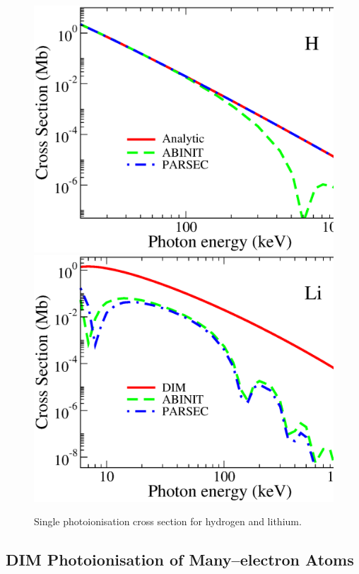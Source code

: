 \documentclass[10pt]{article}
\begin{document}
\begin{figure}[H]
\centering
 \includegraphics[height=0.23\textheight]{figures/pseudopot/photoionH.eps}
 \hspace{0.2cm}
 \includegraphics[height=0.23\textheight]{figures/pseudopot/photoionLi.eps}
\caption{Single photoionisation cross section for hydrogen 
and lithium.}
 \label{fig:photoHLi}
\end{figure}

\subsection{DIM Photoionisation of Many--electron Atoms}
\end{document}
